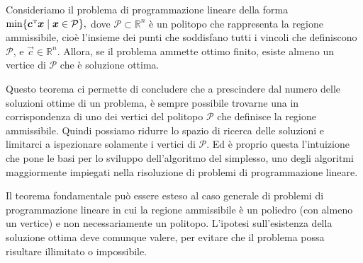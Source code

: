 \begin{LPTheorem}
Consideriamo il problema di programmazione lineare della
forma
\(
    \min \{\bm{c}^{\scriptscriptstyle\mathrm{T}}\bm{x} \mid
    \bm{x} \in \mathcal{P} \},
\)
dove $\mathcal{P} \subset \mathbb{R}^n$ è un politopo che rappresenta la
regione ammissibile, cioè l'insieme dei punti che soddisfano tutti i
vincoli che definiscono $\mathcal{P}$, e $\vec{c} \in \mathbb{R}^n$. Allora,
se il problema ammette ottimo finito, esiste almeno un vertice di
$\mathcal{P}$ che è soluzione ottima.
\end{LPTheorem}
Questo teorema ci permette di concludere che a prescindere dal numero delle
soluzioni ottime di un problema, è sempre possibile trovarne una in
corrispondenza di uno dei vertici del politopo $\mathcal{P}$ che definisce
la regione ammissibile. Quindi possiamo ridurre lo spazio di ricerca delle
soluzioni e limitarci a ispezionare solamente i vertici di $\mathcal{P}$.
Ed è proprio questa l'intuizione che pone le basi per lo sviluppo
dell'algoritmo del simplesso, uno degli algoritmi maggiormente impiegati
nella risoluzione di problemi di programmazione lineare.

Il teorema fondamentale può essere esteso al caso generale di problemi di
programmazione lineare in cui la regione ammissibile è un poliedro (con
almeno un vertice) e non necessariamente un politopo. L'ipotesi
sull'esistenza della soluzione ottima deve comunque valere, per evitare che
il problema possa risultare illimitato o impossibile.

